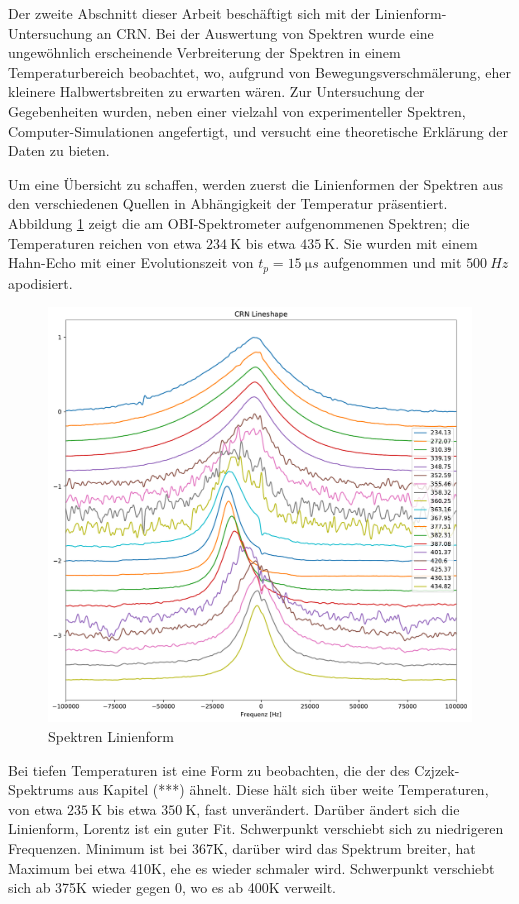 Der zweite Abschnitt dieser Arbeit beschäftigt sich mit der Linienform-Untersuchung an CRN. Bei der Auswertung von Spektren wurde eine ungewöhnlich erscheinende Verbreiterung der Spektren in einem Temperaturbereich beobachtet, wo, aufgrund von Bewegungsverschmälerung, eher kleinere Halbwertsbreiten zu erwarten wären. Zur Untersuchung der Gegebenheiten wurden, neben einer vielzahl von experimenteller Spektren, Computer-Simulationen angefertigt, und versucht eine theoretische Erklärung der Daten zu bieten.

Um eine Übersicht zu schaffen, werden zuerst die Linienformen der Spektren aus den verschiedenen Quellen in Abhängigkeit der Temperatur präsentiert. Abbildung \ref{fig:res:spek_linienform} zeigt die am OBI-Spektrometer aufgenommenen Spektren; die Temperaturen reichen von etwa $\SI{234}{\kelvin}$ bis etwa $\SI{435}{\kelvin}$. Sie wurden mit einem Hahn-Echo mit einer Evolutionszeit von $t_p = \SI{15}{\micro s}$ aufgenommen und mit $\SI{500}{Hz}$ apodisiert.
\begin{figure}
	\begin{center}
		\includegraphics[width=\textwidth]{graphics/plots/SPEK/spek_lineshape.pdf}
	\end{center}
	\caption{Spektren Linienform} \label{fig:res:spek_linienform}
\end{figure}
Bei tiefen Temperaturen ist eine Form zu beobachten, die der des Czjzek-Spektrums aus Kapitel (***) ähnelt. Diese hält sich über weite Temperaturen, von etwa $\SI{235}{\kelvin}$ bis etwa $\SI{350}{\kelvin}$, fast unverändert. 
Darüber ändert sich die Linienform, Lorentz ist ein guter Fit. Schwerpunkt verschiebt sich zu niedrigeren Frequenzen. Minimum ist bei 367K, darüber wird das Spektrum breiter, hat Maximum bei etwa 410K, ehe es wieder schmaler wird. Schwerpunkt verschiebt sich ab 375K wieder gegen 0, wo es ab 400K verweilt.

